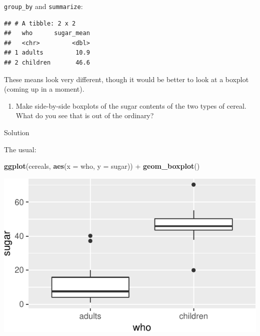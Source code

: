 \documentclass[]{tufte-book}
\newenvironment{Shaded}{}{}
\newcommand{\DataTypeTok}[1]{\textcolor[rgb]{0.56,0.13,0.00}{#1}}
\newcommand{\KeywordTok}[1]{\textcolor[rgb]{0.00,0.44,0.13}{\textbf{#1}}}
\newcommand{\NormalTok}[1]{#1}
\newcommand{\OperatorTok}[1]{\textcolor[rgb]{0.40,0.40,0.40}{#1}}
\newcommand{\StringTok}[1]{\textcolor[rgb]{0.25,0.44,0.63}{#1}}
\providecommand{\tightlist}{%
  \setlength{\itemsep}{0pt}\setlength{\parskip}{0pt}}
\theoremstyle{definition}
\theoremstyle{definition}
\theoremstyle{definition}
\theoremstyle{remark}
\begin{document}
\texttt{group\_by} and \texttt{summarize}:

\begin{Shaded}
\end{Shaded}

\begin{verbatim}
## # A tibble: 2 x 2
##   who      sugar_mean
##   <chr>         <dbl>
## 1 adults         10.9
## 2 children       46.6
\end{verbatim}

These means look very different, though it would be better to look at a
boxplot (coming up in a moment).

\begin{enumerate}
\def\labelenumi{(\alph{enumi})}
\setcounter{enumi}{2}
\tightlist
\item
  Make side-by-side boxplots of the sugar contents of the two types of
  cereal. What do you see that is out of the ordinary?
\end{enumerate}

Solution

The usual:

\begin{Shaded}
\begin{Highlighting}[]
\KeywordTok{ggplot}\NormalTok{(cereals, }\KeywordTok{aes}\NormalTok{(}\DataTypeTok{x =}\NormalTok{ who, }\DataTypeTok{y =}\NormalTok{ sugar)) }\OperatorTok{+}\StringTok{ }\KeywordTok{geom_boxplot}\NormalTok{()}
\end{Highlighting}
\end{Shaded}

\includegraphics{07-sign-mood-median_files/figure-latex/unnamed-chunk-58-1}
\end{document}
